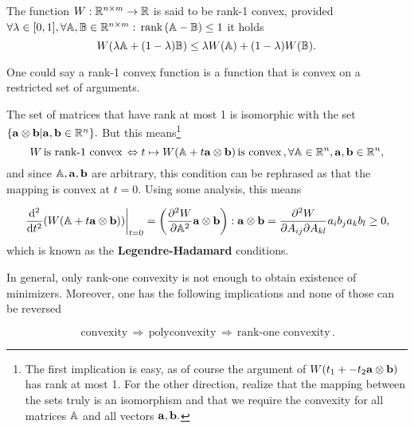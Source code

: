 \documentclass[11pt]{scrartcl} %
\begin{document}
\begin{definition}
	The function $W: {\mathbb R}^{n \times m} \to {\mathbb R}$ is said to be rank-1 convex, provided $\forall \lambda \in [0,1], \forall \mathbb{A}, \mathbb{B} \in {\mathbb R}^{n \times m}: \, \text{rank} \,(\mathbb{A}- \mathbb{B}) \leq 1$ it holds
	\[
		W\qty(\lambda \mathbb{A} + \qty(1-\lambda)\mathbb{B})\leq \lambda W\qty(\mathbb{A}) + \qty(1-\lambda)W\qty(\mathbb{B}).
	\]
\end{definition}
\begin{remark}
    One could say a rank-1 convex function is a function that is convex on a restricted set of arguments.
\end{remark}

The set of matrices that have rank at most 1 is isomorphic with the set $\qty{\vb{a} \otimes \vb{b} | \vb{a}, \vb{b} \in \ensuremath{{\mathbb R}}^{n}}.$ But this means\footnote{The first implication is easy, as of course the argument of $W\qty(t_1 + -t_2 \vb{a} \otimes \vb{b})$ has rank at most 1. For the other direction, realize that the mapping between the sets truly is an isomorphism and that we require the convexity for all matrices $\mathbb{A}$ and all vectors $\vb{a},\vb{b}.$}
\[
	W \, \text{is rank-1 convex} \, \Leftrightarrow t \mapsto W\qty(\mathbb{A}+ t \vb{a} \otimes \vb{b})\, \text{is convex} \,, \forall \mathbb{A} \in {\mathbb R}^{n}, \vb{a}, \vb{b} \in {\mathbb R}^{n},
\]
and since $\mathbb{A}, \vb{a}, \vb{b}$ are arbitrary, this condition can be rephrased as that the mapping is convex at $t = 0.$ Using some analysis, this means

\[
	\eval{\dv[2]{t}\qty(W\qty(\tensorq{A} + t \vb{a} \otimes \vb{b}))}_{t=0} = \qty(\pdv[2]{W}{\tensorq{A}}\vb{a} \otimes \vb{b}): \vb{a}\otimes \vb{b}  = \pdv{W}{A_{ij}}{A_{kl}}a_i b_j a_k b_l \geq 0,
\]
which is known as the \textbf{Legendre-Hadamard} conditions.

In general, only rank-one convexity is not enough to obtain existence of minimizers. Moreover, one has the following implications and none of those can be reversed

\[
	\, \text{convexity} \, \Rightarrow \, \text{polyconvexity} \, \Rightarrow \, \text{rank-one convexity} \,.
\]
\end{document}
